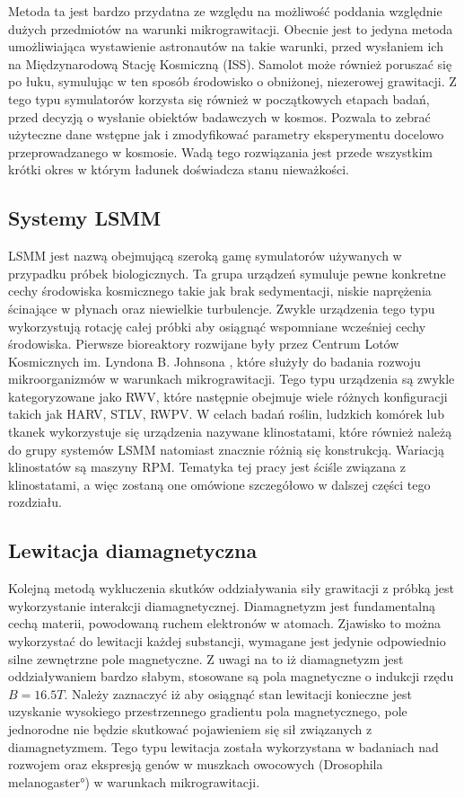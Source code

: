 Metoda ta jest bardzo przydatna ze względu na możliwość poddania względnie dużych przedmiotów na warunki mikrograwitacji. Obecnie jest to jedyna metoda umożliwiająca wystawienie astronautów na takie warunki, przed wysłaniem ich na Międzynarodową Stację Kosmiczną (ISS)\cite{bib:lot_paraboliczny}. Samolot może również poruszać się po łuku, symulując w ten sposób środowisko o obniżonej, niezerowej grawitacji. Z tego typu symulatorów korzysta się również w początkowych etapach badań, przed decyzją o wysłanie obiektów badawczych w kosmos. Pozwala to zebrać użyteczne dane wstępne jak i zmodyfikować parametry eksperymentu docelowo przeprowadzanego w kosmosie. Wadą tego rozwiązania jest przede wszystkim krótki okres w którym ładunek doświadcza stanu nieważkości.

\subsection{Systemy LSMM}

LSMM jest nazwą obejmującą szeroką gamę symulatorów używanych w przypadku próbek biologicznych. Ta grupa urządzeń symuluje pewne konkretne cechy środowiska kosmicznego takie jak brak sedymentacji, niskie naprężenia ścinające w płynach oraz niewielkie turbulencje\cite{bib:lsmm1}. Zwykle urządzenia tego typu wykorzystują rotację całej próbki aby osiągnąć wspomniane wcześniej cechy środowiska. Pierwsze bioreaktory rozwijane były przez Centrum Lotów Kosmicznych im. Lyndona B. Johnsona \cite{bib:lsmm1}, które służyły do badania rozwoju mikroorganizmów w warunkach mikrograwitacji. Tego typu urządzenia są zwykle kategoryzowane jako RWV, które następnie obejmuje wiele różnych konfiguracji takich jak HARV, STLV, RWPV. W celach badań roślin, ludzkich komórek lub tkanek wykorzystuje się urządzenia nazywane klinostatami, które również należą do grupy systemów LSMM natomiast znacznie różnią się konstrukcją. Wariacją klinostatów są maszyny RPM. Tematyka tej pracy jest ściśle związana z klinostatami, a więc zostaną one omówione szczegółowo w dalszej części tego rozdziału.

\subsection{Lewitacja diamagnetyczna}

Kolejną metodą wykluczenia skutków oddziaływania siły grawitacji z próbką jest wykorzystanie interakcji diamagnetycznej. Diamagnetyzm jest fundamentalną cechą materii, powodowaną ruchem elektronów w atomach\cite{bib:kittel}. Zjawisko to można wykorzystać do lewitacji każdej substancji, wymagane jest jedynie odpowiednio silne zewnętrzne pole magnetyczne. Z uwagi na to iż diamagnetyzm jest oddziaływaniem bardzo słabym, stosowane są pola magnetyczne o indukcji rzędu $B=16.5 T$. Należy zaznaczyć iż aby osiągnąć stan lewitacji konieczne jest uzyskanie wysokiego przestrzennego gradientu pola magnetycznego, pole jednorodne nie będzie skutkować pojawieniem się sił związanych z diamagnetyzmem. Tego typu lewitacja została wykorzystana w badaniach nad rozwojem oraz ekspresją genów w muszkach owocowych (\ang{Drosophila melanogaster}) w warunkach mikrograwitacji\cite{bib:lewitacja}.

